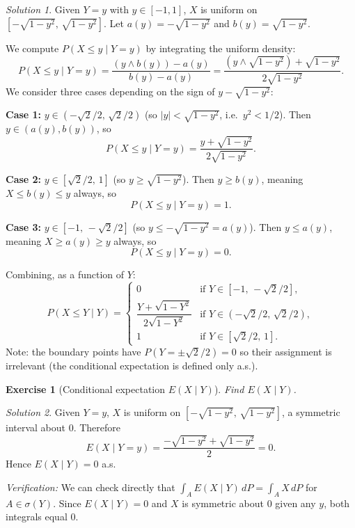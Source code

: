 \documentclass[12pt]{article}
\newtheorem{exercise}{Exercise}
\theoremstyle{remark}
\newtheorem*{solution}{Solution}
\begin{document}
\begin{solution}
Given $Y = y$ with $y \in [-1,1]$, $X$ is uniform on $[-\sqrt{1-y^2},\,\sqrt{1-y^2}]$.
Let $a(y) = -\sqrt{1-y^2}$ and $b(y) = \sqrt{1-y^2}$.

We compute $P(X \le y \mid Y = y)$ by integrating the uniform density:
\[
  P(X \le y \mid Y = y)
  = \frac{(y \wedge b(y)) - a(y)}{b(y) - a(y)}
  = \frac{(y \wedge \sqrt{1-y^2}) + \sqrt{1-y^2}}{2\sqrt{1-y^2}}.
\]
We consider three cases depending on the sign of $y - \sqrt{1-y^2}$:

\textbf{Case 1:} $y \in (-\sqrt{2}/2,\, \sqrt{2}/2)$ (so $|y| < \sqrt{1-y^2}$, i.e.\
$y^2 < 1/2$).  Then $y \in (a(y), b(y))$, so
\[
  P(X \le y \mid Y = y) = \frac{y + \sqrt{1-y^2}}{2\sqrt{1-y^2}}.
\]

\textbf{Case 2:} $y \in [\sqrt{2}/2,\, 1]$ (so $y \ge \sqrt{1-y^2}$).
Then $y \ge b(y)$, meaning $X \le b(y) \le y$ always, so
\[
  P(X \le y \mid Y = y) = 1.
\]

\textbf{Case 3:} $y \in [-1,\, -\sqrt{2}/2]$ (so $y \le -\sqrt{1-y^2} = a(y)$).
Then $y \le a(y)$, meaning $X \ge a(y) \ge y$ always, so
\[
  P(X \le y \mid Y = y) = 0.
\]

\medskip\noindent
Combining, as a function of $Y$:
\[
  \boxed{P(X \le Y \mid Y) = \begin{cases}
    0 & \text{if } Y \in [-1,\,-\sqrt{2}/2], \\[4pt]
    \dfrac{Y + \sqrt{1-Y^2}}{2\sqrt{1-Y^2}} & \text{if } Y \in (-\sqrt{2}/2,\,\sqrt{2}/2), \\[8pt]
    1 & \text{if } Y \in [\sqrt{2}/2,\,1].
  \end{cases}}
\]
Note: the boundary points have $P(Y = \pm\sqrt{2}/2) = 0$ so their assignment is
irrelevant (the conditional expectation is defined only a.s.).
\end{solution}

\begin{exercise}[Conditional expectation $E(X \mid Y)$]
Find $E(X \mid Y)$.
\end{exercise}

\begin{solution}
Given $Y = y$, $X$ is uniform on $[-\sqrt{1-y^2},\,\sqrt{1-y^2}]$, a symmetric interval
about $0$.  Therefore
\[
  E(X \mid Y = y) = \frac{-\sqrt{1-y^2} + \sqrt{1-y^2}}{2} = 0.
\]
Hence $E(X \mid Y) = 0$ a.s.

\medskip\noindent\textit{Verification:} We can check directly that $\int_A E(X \mid Y)\,dP = \int_A X\,dP$ for $A \in \sigma(Y)$.  Since $E(X \mid Y) = 0$ and $X$ is symmetric about $0$ given any $y$, both integrals equal $0$.
\end{solution}
\end{document}
